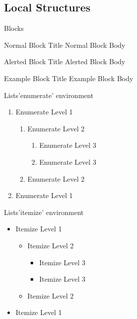 \subsection{Local Structures}
\begin{frame}{Blocks}
\begin{block}{Normal Block Title}
Normal Block Body
\end{block}
\begin{alertblock}{Alerted Block Title}
Alerted Block Body
\end{alertblock}
\begin{exampleblock}{Example Block Title}
Example Block Body
\end{exampleblock}
\end{frame}

\begin{frame}{Lists}{'enumerate' environment}
\begin{enumerate}
  \item Enumerate Level 1
  \begin{enumerate}
    \item Enumerate Level 2
    \begin{enumerate}
      \item Enumerate Level 3
      \item Enumerate Level 3
    \end{enumerate}
    \item Enumerate Level 2
  \end{enumerate}
  \item Enumerate Level 1
\end{enumerate}
\end{frame}

\begin{frame}{Lists}{'itemize' environment}
\begin{itemize}
  \item Itemize Level 1
  \begin{itemize}
    \item Itemize Level 2
    \begin{itemize}
      \item Itemize Level 3
      \item Itemize Level 3
    \end{itemize}
    \item Itemize Level 2
  \end{itemize}
  \item Itemize Level 1
\end{itemize}
\end{frame}

